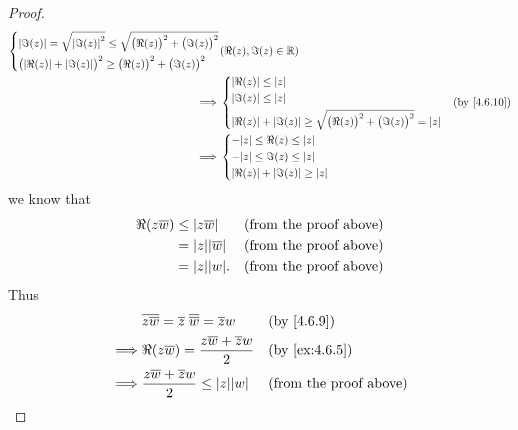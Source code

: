 \begin{proof}
\begin{align*}
\begin{dcases}
                 \abs{\Im(z)} = \sqrt{\abs{\Im(z)}^2} \leq \sqrt{\big(\Re(z)\big)^2 + \big(\Im(z)\big)^2} \\
                 \big(\abs{\Re(z)} + \abs{\Im(z)}\big)^2 \geq \big(\Re(z)\big)^2 + \big(\Im(z)\big)^2
               \end{dcases} & (\Re(z), \Im(z) \in \R) \\
    \implies & \begin{dcases}
                 \abs{\Re(z)} \leq \abs{z} \\
                 \abs{\Im(z)} \leq \abs{z} \\
                 \abs{\Re(z)} + \abs{\Im(z)} \geq \sqrt{\big(\Re(z)\big)^2 + \big(\Im(z)\big)^2} = \abs{z}
               \end{dcases}                                                    &                         & \text{(by \cref{4.6.10})}                       \\
    \implies & \begin{dcases}
                 -\abs{z} \leq \Re(z) \leq \abs{z} \\
                 -\abs{z} \leq \Im(z) \leq \abs{z} \\
                 \abs{\Re(z)} + \abs{\Im(z)} \geq \abs{z}
               \end{dcases}
  \end{align*}
  we know that
  \begin{align*}
    \Re(z \overline{w}) & \leq \abs{z \overline{w}}    &  & \text{(from the proof above)} \\
                        & = \abs{z} \abs{\overline{w}} &  & \text{(from the proof above)} \\
                        & = \abs{z} \abs{w}.           &  & \text{(from the proof above)}
  \end{align*}
  Thus
  \begin{align*}
             & \overline{z \overline{w}} = \overline{z} \; \overline{\overline{w}} = \overline{z} w                   &                                        & \by{4.6.9}                    \\
    \implies & \Re(z \overline{w}) = \dfrac{z \overline{w} + \overline{z} w}{2}                                       &                                        & \text{(by \cref{ex:4.6.5})}   \\
    \implies & \dfrac{z \overline{w} + \overline{z} w}{2} \leq \abs{z} \abs{w}                                        &                                        & \text{(from the proof above)} \\

\end{align*}
\end{proof}
